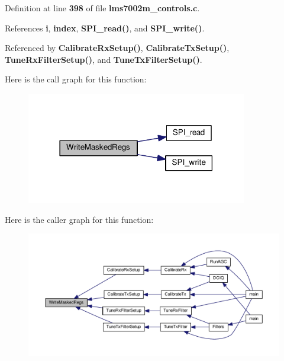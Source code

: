 Definition at line {\bf 398} of file {\bf lms7002m\+\_\+controls.\+c}.



References {\bf i}, {\bf index}, {\bf S\+P\+I\+\_\+read()}, and {\bf S\+P\+I\+\_\+write()}.



Referenced by {\bf Calibrate\+Rx\+Setup()}, {\bf Calibrate\+Tx\+Setup()}, {\bf Tune\+Rx\+Filter\+Setup()}, and {\bf Tune\+Tx\+Filter\+Setup()}.



Here is the call graph for this function\+:
\nopagebreak
\begin{figure}[H]
\begin{center}
\leavevmode
\includegraphics[width=273pt]{d3/d86/lms7002m__controls_8h_a6da6f3d264a9c184fe58dc2945efda1f_cgraph}
\end{center}
\end{figure}




Here is the caller graph for this function\+:
\nopagebreak
\begin{figure}[H]
\begin{center}
\leavevmode
\includegraphics[width=350pt]{d3/d86/lms7002m__controls_8h_a6da6f3d264a9c184fe58dc2945efda1f_icgraph}
\end{center}
\end{figure}


